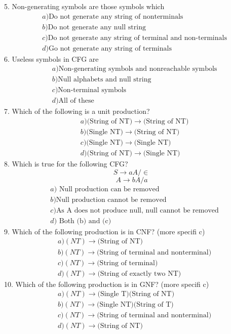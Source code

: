 \documentclass[12pt,a4paper]{book}
\begin{document}
5. Non-generating symbols are those symbols
which
\begin{align*}
&a) \text{Do not generate any string of nonterminals}\\
&b) \text{Do not generate any null string}\\
&c) \text{Do not generate any string of terminal and non-terminals}\\
&d) \text{Go not generate any string of terminals}
\end{align*}
6. Useless symbols in CFG are
\begin{align*}
&a) \text{Non-generating symbols and nonreachable symbols}\\
&b) \text{Null alphabets and null string}\\
&c) \text{Non-terminal symbols}\\
&d) \text{All of these}
\end{align*}
7. Which of the following is a unit production?
\begin{align*}
&a) \text{(String of NT)} \to \text{(String of NT)}\\
&b) \text{(Single NT)} \to \text{(String of NT)}\\
&c) \text{(Single NT)} \to \text{(Single NT)}\\
&d) \text{(String of NT)} \to \text{(Single NT)}
\end{align*}
8. Which is true for the following CFG?
\[S \to aA/\in \]
\[A \to bA/a \]
\begin{align*}
&a)\text{ Null production can be removed} \\
&b) \text{Null production cannot be removed} \\
&c) \text{As A does not produce null, null cannot be removed} \\
&d)\text{ Both (b) and (c)}
\end{align*}
9. Which of the following production is in CNF? (more specifi c)
\begin{align*}
&a) (NT) \to \text{(String of NT)}\\
&b) (NT) \to \text{(String of terminal and nonterminal)}\\
&c) (NT) \to \text{(String of terminal)}\\
&d) (NT) \to \text{(String of exactly two NT)}
\end{align*}
10. Which of the following production is in GNF? (more specifi c)
\begin{align*}
&a) (NT) \to \text{(Single T)(String of NT)}\\
&b) (NT) \to \text{(Single NT)(String of T)}\\
&c) (NT) \to \text{(String of terminal and nonterminal)}\\
&d) (NT) \to \text{(String of NT)}
\end{align*}
\end{document}
